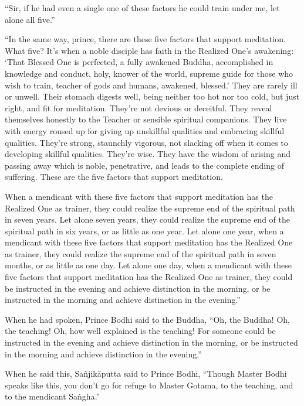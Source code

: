 \documentclass[12pt,openany]{book}%
\begin{document}
“Sir, if he had even a single one of these factors he could train under me, let alone all five.” 

“In the same way, prince, there are these five factors that support meditation. What five? It’s when a noble disciple has faith in the Realized One’s awakening: ‘That Blessed One is perfected, a fully awakened Buddha, accomplished in knowledge and conduct, holy, knower of the world, supreme guide for those who wish to train, teacher of gods and humans, awakened, blessed.’ They are rarely ill or unwell. Their stomach digests well, being neither too hot nor too cold, but just right, and fit for meditation. They’re not devious or deceitful. They reveal themselves honestly to the Teacher or sensible spiritual companions. They live with energy roused up for giving up unskillful qualities and embracing skillful qualities. They’re strong, staunchly vigorous, not slacking off when it comes to developing skillful qualities. They’re wise. They have the wisdom of arising and passing away which is noble, penetrative, and leads to the complete ending of suffering. These are the five factors that support meditation. 

When a mendicant with these five factors that support meditation has the Realized One as trainer, they could realize the supreme end of the spiritual path in seven years. Let alone seven years, they could realize the supreme end of the spiritual path in six years, or as little as one year. Let alone one year, when a mendicant with these five factors that support meditation has the Realized One as trainer, they could realize the supreme end of the spiritual path in seven months, or as little as one day. Let alone one day, when a mendicant with these five factors that support meditation has the Realized One as trainer, they could be instructed in the evening and achieve distinction in the morning, or be instructed in the morning and achieve distinction in the evening.” 

When he had spoken, Prince Bodhi said to the Buddha, “Oh, the Buddha! Oh, the teaching! Oh, how well explained is the teaching! For someone could be instructed in the evening and achieve distinction in the morning, or be instructed in the morning and achieve distinction in the evening.” 

When he said this, \textsanskrit{Sañjikāputta} said to Prince Bodhi, “Though Master Bodhi speaks like this, you don’t go for refuge to Master Gotama, to the teaching, and to the mendicant \textsanskrit{Saṅgha}.” 
\end{document}
